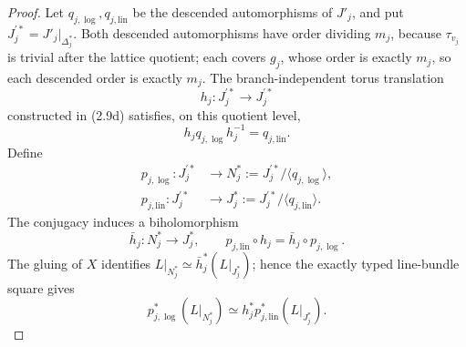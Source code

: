 \begin{proof}
Let \(q_{j,\log},q_{j,\mathrm{lin}}\) be the descended automorphisms of \(J'_j\),
and put \(J_j^{\prime *}=J'_j|_{\Delta_j^*}\).  Both descended automorphisms have
order dividing \(m_j\), because \(\tau_{v_j}\) is trivial after the lattice
quotient; each covers \(g_j\), whose order is exactly \(m_j\), so each
descended order is exactly \(m_j\).
The branch-independent torus translation
\[
 h_j:J_j^{\prime *}\longrightarrow J_j^{\prime *}
\]
constructed in (2.9d) satisfies, on this quotient level,
\[
 h_jq_{j,\log}h_j^{-1}=q_{j,\mathrm{lin}}.
\]
Define
\[
\begin{aligned}
 p_{j,\log}:J_j^{\prime *}&\longrightarrow
  N_j^*:=J_j^{\prime *}/\langle q_{j,\log}\rangle,\\
 p_{j,\mathrm{lin}}:J_j^{\prime *}&\longrightarrow
 J_j^*:=J_j^{\prime *}/\langle q_{j,\mathrm{lin}}\rangle .
\end{aligned}
\]
The conjugacy induces a biholomorphism
\[
 \bar h_j:N_j^*\longrightarrow J_j^*,\qquad
 p_{j,\mathrm{lin}}\circ h_j=\bar h_j\circ p_{j,\log}.
\]
The gluing of \(X\) identifies
\(L|_{N_j^*}\simeq\bar h_j^*(L|_{J_j^*})\); hence the exactly typed
line-bundle square gives
\[
 p_{j,\log}^*(L|_{N_j^*})
 \simeq h_j^*p_{j,\mathrm{lin}}^*(L|_{J_j^*}).
\tag{W.107}\label{wbII:eq:W:5.17-A14a}
\]


\end{proof}
